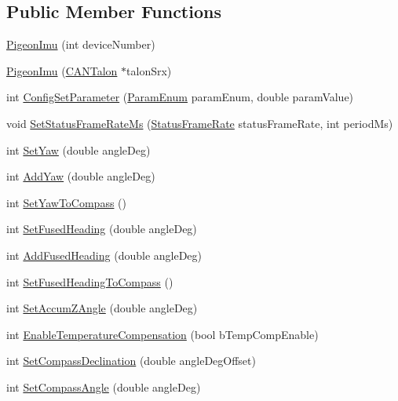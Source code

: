 \subsection*{Public Member Functions}
\begin{DoxyCompactItemize}
\item 
\hyperlink{class_pigeon_imu_a17124934b892249efa8006536d3e777e}{Pigeon\+Imu} (int device\+Number)
\item 
\hyperlink{class_pigeon_imu_ac8622c6a54ac5763d80a662b82826aa1}{Pigeon\+Imu} (\hyperlink{class_c_a_n_talon}{C\+A\+N\+Talon} $\ast$talon\+Srx)
\item 
int \hyperlink{class_pigeon_imu_a8a7869d0848c65ab241f2592771c4341}{Config\+Set\+Parameter} (\hyperlink{class_pigeon_imu_a9c6cc7a5797d5fce467e31040e1dbb2a}{Param\+Enum} param\+Enum, double param\+Value)
\item 
void \hyperlink{class_pigeon_imu_a44dd2494ea4902480eaab3e9bfe01168}{Set\+Status\+Frame\+Rate\+Ms} (\hyperlink{class_pigeon_imu_a655b831f9be6c185f1cc553679776b31}{Status\+Frame\+Rate} status\+Frame\+Rate, int period\+Ms)
\item 
int \hyperlink{class_pigeon_imu_aeebdd0e34a7542d5155e72fe673f97f2}{Set\+Yaw} (double angle\+Deg)
\item 
int \hyperlink{class_pigeon_imu_af2a22a05165f430d3ab312ac5691cb86}{Add\+Yaw} (double angle\+Deg)
\item 
int \hyperlink{class_pigeon_imu_a29650649072af38bf838846f8d961828}{Set\+Yaw\+To\+Compass} ()
\item 
int \hyperlink{class_pigeon_imu_a32a7f752dd5b912289de592df53f6c84}{Set\+Fused\+Heading} (double angle\+Deg)
\item 
int \hyperlink{class_pigeon_imu_aa83b1c10badcc495e5a29b520b0a6ac7}{Add\+Fused\+Heading} (double angle\+Deg)
\item 
int \hyperlink{class_pigeon_imu_a1c26ba00bce3ddddf3b15b464048debf}{Set\+Fused\+Heading\+To\+Compass} ()
\item 
int \hyperlink{class_pigeon_imu_ab1c1a0f830c12f3c84c181ca9970033a}{Set\+Accum\+Z\+Angle} (double angle\+Deg)
\item 
int \hyperlink{class_pigeon_imu_a5454ebd8ff7820e18119422749f1401a}{Enable\+Temperature\+Compensation} (bool b\+Temp\+Comp\+Enable)
\item 
int \hyperlink{class_pigeon_imu_a92246bd9e20249a1bf91402ad2477587}{Set\+Compass\+Declination} (double angle\+Deg\+Offset)
\item 
int \hyperlink{class_pigeon_imu_a12dbe41e1e7bbcd6bd84d3294a5f82eb}{Set\+Compass\+Angle} (double angle\+Deg)

\end{DoxyCompactItemize}
